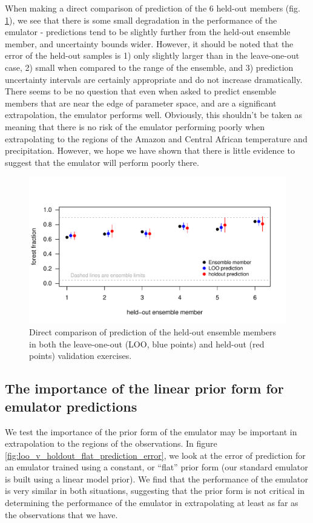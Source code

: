 \documentclass[gmd, manuscript]{copernicus} %
\begin{document}
When making a direct comparison of prediction of the 6 held-out members (fig. \ref{fig:loo_v_holdout1_prediction_error}), we see that there is some small degradation in the performance of the emulator - predictions tend to be slightly further from the held-out ensemble member, and uncertainty bounds wider. However, it should be noted that the error of the held-out samples is 1) only slightly larger than in the leave-one-out case, 2) small when compared to the range of the ensemble, and 3) prediction uncertainty intervals are certainly appropriate and do not increase dramatically. There seems to be no question that even when asked to predict ensemble members that are near the edge of parameter space, and are a significant extrapolation, the emulator performs well. Obviously, this shouldn’t be taken as meaning that there is no risk of the emulator performing poorly when extrapolating to the regions of the Amazon and Central African temperature and precipitation. However, we hope we have shown that there is little evidence to suggest that the emulator will perform poorly there. 

\begin{figure}[t]
\includegraphics[width=12cm]{../graphics/figS04.pdf}
\caption{Direct comparison of prediction of the held-out ensemble members in both the leave-one-out (LOO, blue points) and held-out (red points) validation exercises.}
\label{fig:loo_v_holdout1_prediction_error}
\end{figure}


\subsection{The importance of the linear prior form for emulator predictions}
We test the importance of the prior form of the emulator may be important in extrapolation to the regions of the observations. In figure \ref{fig:loo_v_holdout_flat_prediction_error}, we look at the error of prediction for an emulator trained using a constant, or “flat” prior form (our standard emulator is built using a linear model prior). We find that the performance of the emulator is very similar in both situations, suggesting that the prior form is not critical in determining the performance of the emulator in extrapolating at least as far as the observations that we have.
\end{document}

